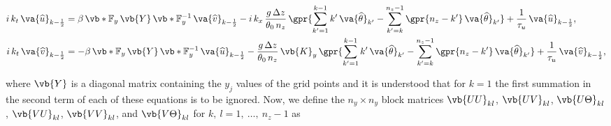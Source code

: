 \begin{subequations}
	\begin{align}
		i\,k_t\,\va{\widehat{u}}_{k - \frac{1}{2}} &= \beta\,\vb*{\mathbb{F}}_y\,\vb{Y}\,\vb*{\mathbb{F}}_y^{-1}\,\va{\widehat{v}}_{k - \frac{1}{2}} - i\,k_x\,\frac{g\,\Delta z}{\theta_0\,n_z}\,\gpr{\sum_{k' = 1}^{k - 1} k'\,\va{\widehat{\theta}}_{k'} - \sum_{k' = k}^{n_z - 1} \gpr{n_z - k'}\,\va{\widehat{\theta}}_{k'}} + \frac{1}{\tau_u}\,\va{\widehat{u}}_{k - \frac{1}{2}},\\
		i\,k_t\,\va{\widehat{v}}_{k - \frac{1}{2}} &= -\beta\,\vb*{\mathbb{F}}_y\,\vb{Y}\,\vb*{\mathbb{F}}_y^{-1}\,\va{\widehat{u}}_{k - \frac{1}{2}} - \frac{g\,\Delta z}{\theta_0\,n_z}\,\vb{K}_y\,\gpr{\sum_{k' = 1}^{k - 1} k'\,\va{\widehat{\theta}}_{k'} - \sum_{k' = k}^{n_z - 1} \gpr{n_z - k'}\,\va{\widehat{\theta}}_{k'}} + \frac{1}{\tau_u}\,\va{\widehat{v}}_{k - \frac{1}{2}},
	\end{align}
\end{subequations}

where $\vb{Y}$ is a diagonal matrix containing the $y_j$ values of the grid points and it is understood that for $k = 1$ the first summation in the second term of each of these equations is to be ignored. Now, we define the $n_y \times n_y$ block matrices $\vb{UU}_{kl}$, $\vb{UV}_{kl}$, $\vb{U\Theta}_{kl}$, $\vb{VU}_{kl}$, $\vb{VV}_{kl}$, and $\vb{V\Theta}_{kl}$ for $k,\ l = 1,\ \dots,\ n_z - 1$ as

